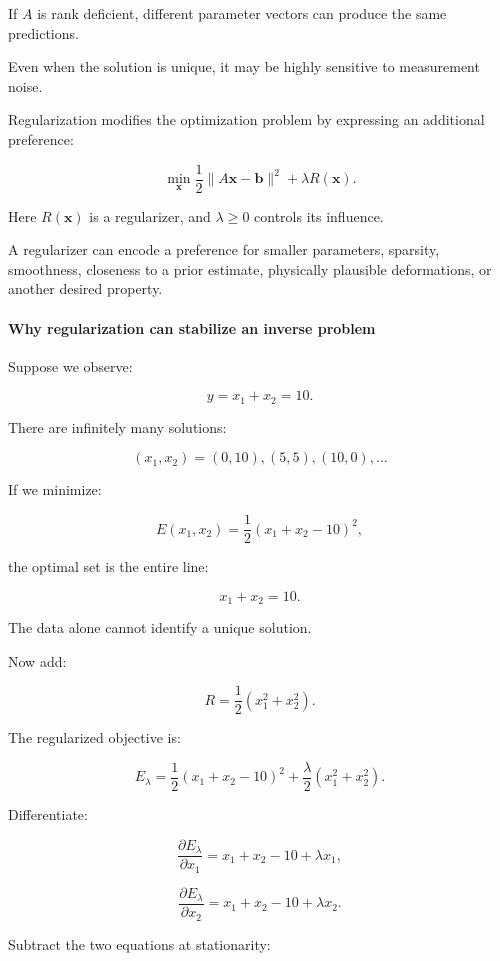 If \(A\) is rank deficient, different parameter vectors can produce the same predictions.

Even when the solution is unique, it may be highly sensitive to measurement noise.

Regularization modifies the optimization problem by expressing an additional preference:

\[
\boxed{ \min_{\mathbf x} \frac12\|A\mathbf x-\mathbf b\|^2 + \lambda R(\mathbf x) }.
\]

Here \(R(\mathbf x)\) is a regularizer, and \(\lambda\ge0\) controls its influence.

A regularizer can encode a preference for smaller parameters, sparsity, smoothness, closeness to a prior estimate, physically plausible deformations, or another desired property.

\paragraph{Why regularization can stabilize an inverse problem}\label{02-foundations-ii-ch027-why-regularization-can-stabilize-an-inverse-problem}

\hypertarget{02-foundations-ii-ch027-why-regularization-can-stabilize-an-inverse-problem}{}

Suppose we observe:

\[
y=x_1+x_2=10.
\]

There are infinitely many solutions:

\[
(x_1,x_2)=(0,10),(5,5),(10,0),\ldots
\]

If we minimize:

\[
E(x_1,x_2)=\frac12(x_1+x_2-10)^2,
\]

the optimal set is the entire line:

\[
x_1+x_2=10.
\]

The data alone cannot identify a unique solution.

Now add:

\[
R=\frac12(x_1^2+x_2^2).
\]

The regularized objective is:

\[
E_\lambda= \frac12(x_1+x_2-10)^2 +\frac\lambda2(x_1^2+x_2^2).
\]

Differentiate:

\[
\frac{\partial E_\lambda}{\partial x_1} = x_1+x_2-10+\lambda x_1,
\]

\[
\frac{\partial E_\lambda}{\partial x_2} = x_1+x_2-10+\lambda x_2.
\]

Subtract the two equations at stationarity:

